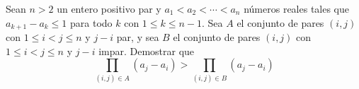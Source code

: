 Sean $n>2$ un entero positivo par y $a_1 < a_2 < \cdots < a_n$ números reales tales que $a_{k+1} - a_k \leq 1$ para todo $k$ con $1 \leq k \leq n-1$. Sea $A$ el conjunto de pares $(i,j)$ con $1 \leq i < j \leq n$ y $j-i$ par, y sea $B$ el conjunto de pares $(i,j)$ con $1 \leq i < j \leq n$ y $j-i$ impar. Demostrar que
\[ \prod_{(i,j) \in A} (a_j - a_i) > \prod_{(i,j) \in B} (a_j - a_i) \]
